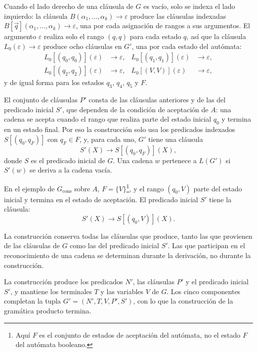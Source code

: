 Cuando el lado derecho de una cláusula de $G$ es vacío, solo se indexa el lado izquierdo: la cláusula $B(\alpha_1, \ldots, \alpha_k) \to \varepsilon$
produce las cláusulas indexadas $B[\vec q](\alpha_1, \ldots, \alpha_k) \to
\varepsilon$, una por cada asignación de rangos a sus argumentos. El
argumento $\varepsilon$ realiza solo el rango $(q, q)$ para cada estado
$q$, así que la cláusula $L_0(\varepsilon) \to \varepsilon$ produce ocho
cláusulas en $G'$, una por cada estado del autómata:
\begin{align*}
  L_0[(q_0, q_0)](\varepsilon) &\to \varepsilon, &
  L_0[(q_1, q_1)](\varepsilon) &\to \varepsilon, \\
  L_0[(q_2, q_2)](\varepsilon) &\to \varepsilon, &
  L_0[(V, V)](\varepsilon) &\to \varepsilon,
\end{align*}
y de igual forma para los estados $q_3$, $q_4$, $q_5$ y $F$.

El conjunto de cláusulas $P'$ consta de las cláusulas anteriores y de
las del predicado inicial $S'$, que dependen de la condición de
aceptación de $A$: una cadena se acepta cuando el rango que realiza
parte del estado inicial $q_0$ y termina en un estado final. Por eso la
construcción solo usa los predicados indexados $S[(q_0, q_F)]$ con
$q_F \in F$, y, para cada uno, $G'$ tiene una cláusula
\[
  S'(X) \to S[(q_0, q_F)](X),
\]
donde $S$ es el predicado inicial de $G$. Una cadena $w$ pertenece a
$L(G')$ si $S'(w)$ se deriva a la cadena vacía.

En el ejemplo de $G_{\mathrm{cons}}$ sobre $A$, $F = \{V\}$\footnote{Aquí
$F$ es el conjunto de estados de aceptación del autómata, no el estado
$F$ del autómata booleano.}, y el rango
$(q_0, V)$ parte del estado inicial y termina en el estado de
aceptación. El predicado inicial $S'$ tiene la cláusula:
\[
  S'(X) \to S[(q_0, V)](X).
\]

La construcción conserva todas las cláusulas que produce, tanto las
que provienen de las cláusulas de $G$ como las del predicado inicial
$S'$. Las que participan en el reconocimiento de una cadena se
determinan durante la derivación, no durante la construcción.

La construcción produce los predicados $N'$, las cláusulas $P'$ y el
predicado inicial $S'$, y mantiene los terminales $T$ y las variables
$V$ de $G$. Los cinco componentes completan la tupla
$G' = (N', T, V, P', S')$, con lo que la construcción de la gramática
producto termina.

